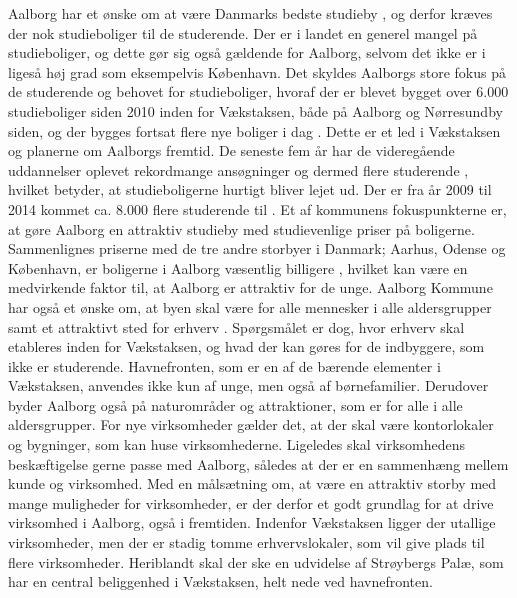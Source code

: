 \newline
\newline
Aalborg har et ønske om at være Danmarks bedste studieby \citep{ungdom}, og derfor kræves der nok studieboliger til de studerende. Der er i landet en generel mangel på studieboliger, og dette gør sig også gældende for Aalborg, selvom det ikke er i ligeså høj grad som eksempelvis København. Det skyldes Aalborgs store fokus på de studerende og behovet for studieboliger, hvoraf der er blevet bygget over 6.000 studieboliger siden 2010 inden for Vækstaksen, både på Aalborg og Nørresundby siden, og der bygges fortsat flere nye boliger i dag \citep{studieboliger}. Dette er et led i Vækstaksen og planerne om Aalborgs fremtid. De seneste fem år har de videregående uddannelser oplevet rekordmange ansøgninger og dermed flere studerende \citep{uddannelser}, hvilket betyder, at studieboligerne hurtigt bliver lejet ud. Der er fra år 2009 til 2014 kommet ca. 8.000 flere studerende til \citep[ s. 9]{unital}. Et af kommunens fokuspunkterne er, at gøre Aalborg en attraktiv studieby med studievenlige priser på boligerne. Sammenlignes priserne med de tre andre storbyer i Danmark; Aarhus, Odense og København, er boligerne i Aalborg væsentlig billigere \citep{home}, hvilket kan være en medvirkende faktor til, at Aalborg er attraktiv for de unge.
\newline
\newline
Aalborg Kommune har også et ønske om, at byen skal være for alle mennesker i alle aldersgrupper samt et attraktivt sted for erhverv \citep{kl} \citep{kommuneplan3}. Spørgsmålet er dog, hvor erhverv skal etableres inden for Vækstaksen, og hvad der kan gøres for de indbyggere, som ikke er studerende. Havnefronten, som er en af de bærende elementer i Vækstaksen, anvendes ikke kun af unge, men også af børnefamilier. Derudover byder Aalborg også på naturområder og attraktioner, som er for alle i alle aldersgrupper.
\newline
\newline
For nye virksomheder gælder det, at der skal være kontorlokaler og bygninger, som kan huse virksomhederne. Ligeledes skal virksomhedens beskæftigelse gerne passe med Aalborg, således at der er en sammenhæng mellem kunde og virksomhed. Med en målsætning om, at være en attraktiv storby med mange muligheder for virksomheder, er der derfor et godt grundlag for at drive virksomhed i Aalborg, også i fremtiden. Indenfor Vækstaksen ligger der utallige virksomheder, men der er stadig tomme erhvervslokaler, som vil give plads til flere virksomheder. Heriblandt skal der ske en udvidelse af Strøybergs Palæ, som har en central beliggenhed i Vækstaksen, helt nede ved havnefronten.

